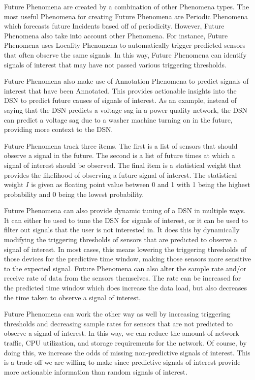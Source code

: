 Future Phenomena are created by a combination of other Phenomena types. The most useful Phenomena for creating Future Phenomena are Periodic Phenomena which forecasts future Incidents based off of periodicity. However, Future Phenomena also take into account other Phenomena. For instance, Future Phenomena uses Locality Phenomena to automatically trigger predicted sensors that often observe the same signals. In this way, Future Phenomena can identify signals of interest that may have not passed various triggering thresholds.

Future Phenomena also make use of Annotation Phenomena to predict signals of interest that have been Annotated. This provides actionable insights into the DSN to predict future causes of signals of interest. As an example, instead of saying that the DSN predicts a voltage sag in a power quality network, the DSN can predict a voltage sag due to a washer machine turning on in the future, providing more context to the DSN\@.

Future Phenomena track three items. The first is a list of sensors that should observe a signal in the future. The second is a list of future times at which a signal of interest should be observed. The final item is a statistical weight that provides the likelihood of observing a future signal of interest. The statistical weight $I$ is given as floating point value between 0 and 1 with 1 being the highest probability and 0 being the lowest probability.

Future Phenomena can also provide dynamic tuning of a DSN in multiple ways. It can either be used to tune the DSN for signals of interest, or it can be used to filter out signals that the user is not interested in. It does this by dynamically modifying the triggering thresholds of sensors that are predicted to observe a signal of interest. In most cases, this means lowering the triggering thresholds of those devices for the predictive time window, making those sensors more sensitive to the expected signal. Future Phenomena can also alter the sample rate and/or receive rate of data from the sensors themselves. The rate can be increased for the predicted time window which does increase the data load, but also decreases the time taken to observe a signal of interest.

Future Phenomena can work the other way as well by increasing triggering thresholds and decreasing sample rates for sensors that are not predicted to observe a signal of interest. In this way, we can reduce the amount of network traffic, CPU utilization, and storage requirements for the network. Of course, by doing this, we increase the odds of missing non-predictive signals of interest. This is a trade-off we are willing to make since predictive signals of interest provide more actionable information than random signals of interest.


